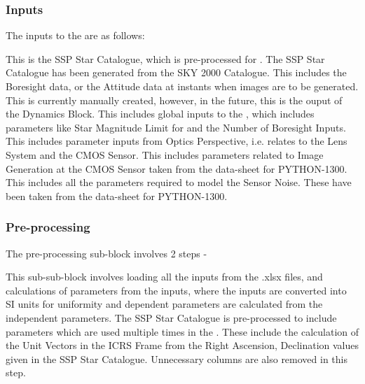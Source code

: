 \subsubsection{Inputs}
The inputs to the \SISM are as follows:
\begin{enumerate}[label={}]
     This is the SSP Star Catalogue, which is pre-processed for \SIS. The SSP Star Catalogue has been generated from the SKY 2000 Catalogue. 
     This includes the Boresight data, or the Attitude data at instants when images are to be generated. This is currently manually created, however, in the future, this is the ouput of the Dynamics Block.
     This includes global inputs to the \SISM, which includes parameters like Star Magnitude Limit for \SISM and the Number of Boresight Inputs. 
     This includes parameter inputs from Optics Perspective, i.e. relates to the Lens System and the CMOS Sensor.
     This includes parameters related to Image Generation at the CMOS Sensor taken from the data-sheet for PYTHON-1300.
     This includes all the parameters required to model the Sensor Noise. These have been taken from the data-sheet for PYTHON-1300.
\end{enumerate}


\subsubsection{Pre-processing} %
The pre-processing sub-block involves 2 steps -
\begin{enumerate}[label={}]
     This sub-sub-block involves loading all the inputs from the .xlsx files, and calculations of parameters from the inputs, where the inputs are converted into SI units for uniformity and dependent parameters are calculated from the independent parameters. 
     The SSP Star Catalogue is pre-processed to include parameters which are used multiple times in the \SIS. These include the calculation of the Unit Vectors in the ICRS Frame from the Right Ascension, Declination values given in the SSP Star Catalogue. Unnecessary columns are also removed in this step. 
\end{enumerate}


